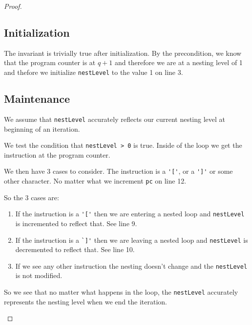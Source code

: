 \documentclass[10pt]{amsart}
\newcommand{\inl}{\lstinline[breaklines=true]}
\begin{document}
\begin{proof}
\subsection*{Initialization}
The invariant is trivially true after initialization. By the precondition,
we know that the program counter is at $q + 1$ and therefore we are at a
nesting level of 1 and thefore we initialize \inl!nestLevel! to the value 1
on line 3.

\subsection*{Maintenance}
We assume that \inl!nestLevel! accurately
reflects our current nesting level at beginning of an iteration.

We test the condition that \inl!nestLevel > 0! is true. Inside of the loop
we get the instruction at the program counter.

We then have 3 cases to consider. The instruction is a \inl!'['!, or a
\inl!']'! or some other character. No matter what we increment \inl!pc!  on
line 12.

So the 3 cases are:

\begin{enumerate}
\item If the instruction is a \inl!'['! then we are entering a nested loop and
\inl!nestLevel! is incremented to reflect that. See line 9. 

\item If the instruction is a \inl!`]'! then we are leaving a nested loop and
\inl!nestLevel! is decremented to reflect that. See line 10.

\item If we see any other instruction the nesting doesn't change and
the \inl!nestLevel! is not modified.
\end{enumerate}

So we see that no matter what happens in the loop, the \inl!nestLevel!
accurately represents the nesting level when we end the iteration.

\begin{center}
\end{center}


\end{proof}
\end{document}
